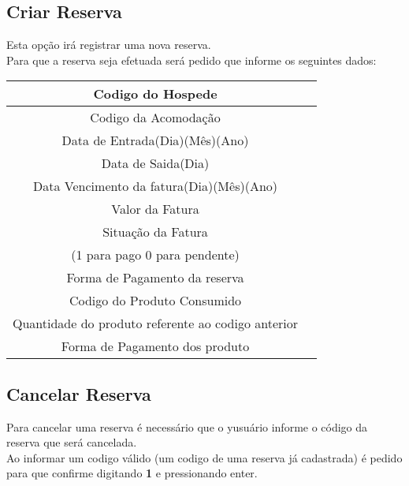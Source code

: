 \documentclass[titlepage]{article}
\begin{document}
				\subsection{Criar Reserva}
				Esta opção irá registrar uma nova reserva.\\
				Para que a reserva seja efetuada será pedido que informe os seguintes dados:
				\begin{table}[h]%
					\begin{tabular}{|c|c|}
					\hline
					Codigo do Hospede\\
					\hline
					Codigo da Acomodação\\
					\hline
					Data de Entrada(Dia)(Mês)(Ano)\\
					\hline
					Data de Saida(Dia)\\
					\hline
					Data Vencimento da fatura(Dia)(Mês)(Ano)\\
					\hline
					Valor da Fatura\\
					\hline
					Situação da Fatura\\(1 para pago 0 para pendente)\\
					\hline
					Forma de Pagamento da reserva\\
					\hline
					Codigo do Produto Consumido\\
					\hline
					Quantidade do produto referente ao codigo anterior\\
					\hline
					Forma de Pagamento dos produto\\
					\hline
					\end{tabular}
				\end{table}
				\subsection{Cancelar Reserva}
				Para cancelar uma reserva é necessário que o yusuário informe o código da reserva que será cancelada.\\
				Ao informar um codigo válido (um codigo de uma reserva já cadastrada) é pedido para que confirme digitando \textbf{1} e pressionando enter.

				\newpage
\end{document}
